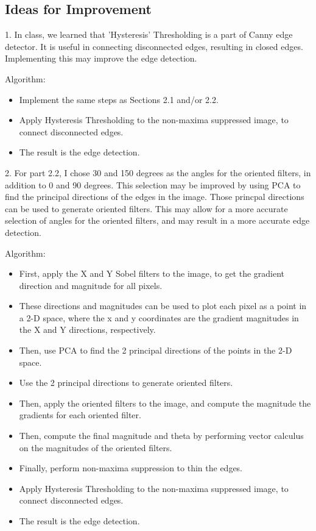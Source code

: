 \documentclass[12pt]{article}
\begin{document}
\subsection{Ideas for Improvement}
1. In class, we learned that 'Hysteresis' Thresholding is a part of Canny edge detector. It is useful in connecting disconnected edges, resulting in closed edges. Implementing this may improve the edge detection.

Algorithm:
\begin{itemize}
    \item Implement the same steps as Sections 2.1 and/or 2.2.
    \item Apply Hysteresis Thresholding to the non-maxima suppressed image, to connect disconnected edges.
    \item The result is the edge detection.
\end{itemize}

2. For part 2.2, I chose 30 and 150 degrees as the angles for the oriented filters, in addition to 0 and 90 degrees. This selection may be improved by using PCA to find the principal directions of the edges in the image. Those princpal directions can be used to generate oriented filters. This may allow for a more accurate selection of angles for the oriented filters, and may result in a more accurate edge detection.

Algorithm:
\begin{itemize}
    \item First, apply the X and Y Sobel filters to the image, to get the gradient direction and magnitude for all pixels.
    \item These directions and magnitudes can be used to plot each pixel as a point in a 2-D space, where the x and y coordinates are the gradient magnitudes in the X and Y directions, respectively.
    \item Then, use PCA to find the 2 principal directions of the points in the 2-D space.
    \item Use the 2 principal directions to generate oriented filters.
    \item Then, apply the oriented filters to the image, and compute the magnitude the gradients for each oriented filter.
    \item Then, compute the final magnitude and theta by performing vector calculus on the magnitudes of the oriented filters.
    \item Finally, perform non-maxima suppression to thin the edges.
    \item Apply Hysteresis Thresholding to the non-maxima suppressed image, to connect disconnected edges.
    \item The result is the edge detection.
\end{itemize}
\end{document}

